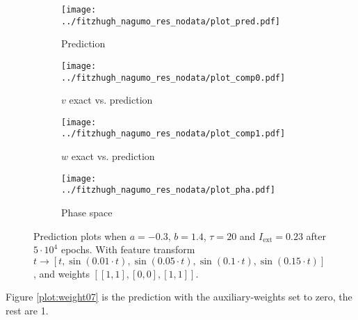 \documentclass[a4paper]{article}
\begin{document}
\begin{figure}[H]
	\centering 
	\begin{subfigure}[b]{0.47\textwidth}
		\centering
		\texttt{[image: ../fitzhugh\_nagumo\_res\_nodata/plot\_pred.pdf]}
		\caption{Prediction}
		\label{fig:weight06a}
	\end{subfigure}
	\begin{subfigure}[b]{0.47\textwidth}
		\centering
		\texttt{[image: ../fitzhugh\_nagumo\_res\_nodata/plot\_comp0.pdf]}
		\caption{$v$ exact vs. prediction}
		\label{fig:weight06b}
	\end{subfigure}
	\begin{subfigure}[b]{0.47\textwidth}
		\centering
		\texttt{[image: ../fitzhugh\_nagumo\_res\_nodata/plot\_comp1.pdf]}
		\caption{$w$ exact vs. prediction}
		\label{fig:weight06c}
	\end{subfigure}
	\begin{subfigure}[b]{0.47\textwidth}
		\centering
		\texttt{[image: ../fitzhugh\_nagumo\_res\_nodata/plot\_pha.pdf]}
		\caption{Phase space}
		\label{fig:weight06d}
	\end{subfigure}
	\caption{Prediction plots when $a=-0.3$, $b=1.4$, $\tau=20$ and $ I_{\text{ext}}=0.23$ after $5\cdot10^4$ epochs. With feature transform $t \rightarrow \left[ t, \sin(0.01 \cdot  t), \sin(0.05 \cdot  t), \sin(0.1 \cdot  t), \sin(0.15 \cdot  t)\right] $, and weights $\left[ \left[ 1, 1\right], \left[ 0, 0\right], \left[ 1, 1\right]\right]$.}
	\label{plot:weight06}
\end{figure}

Figure \ref{plot:weight07} is the prediction with the auxiliary-weights set to zero, the rest are 1.
\end{document}
